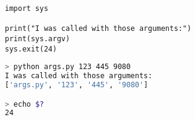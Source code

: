 \documentclass[aspectratio=169]{beamer}
\begin{document}
\begin{frame}[fragile]
\begin{lstlisting}
import sys

print("I was called with those arguments:")
print(sys.argv)
sys.exit(24)
\end{lstlisting}
\vspace{1.5cm}
\begin{lstlisting}[language=sh]
> python args.py 123 445 9080
I was called with those arguments:
['args.py', '123', '445', '9080']

> echo $?
24
\end{lstlisting}
\end{frame}
\end{document}
